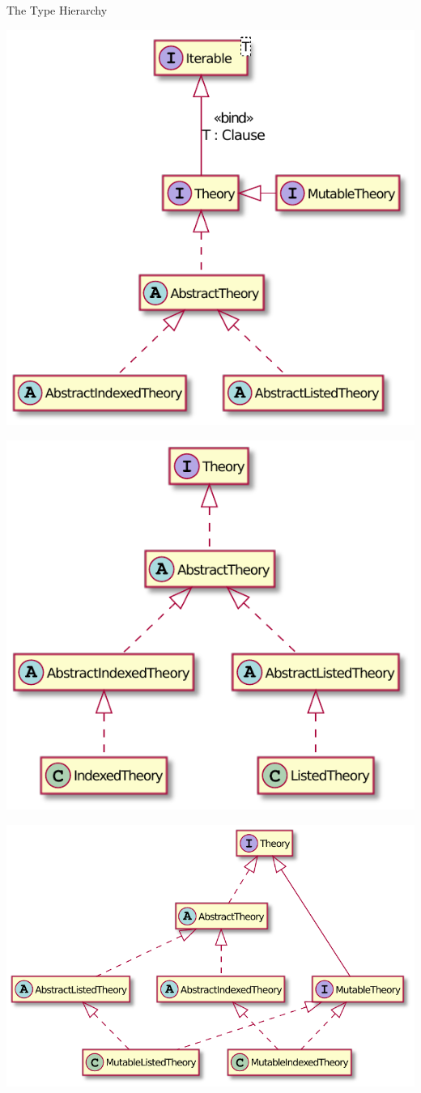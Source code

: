 \documentclass[handout]{beamer}
\begin{document}
\begin{frame}[allowframebreaks]{The  Type Hierarchy}

    \begin{center}
        \includegraphics[width=0.6\linewidth]{img/theory-base.pdf}
    \end{center}

    \framebreak

    \begin{center}
        \includegraphics[width=0.6\linewidth]{img/theory-immutable.pdf}
    \end{center}

    \framebreak

    \begin{center}
        \includegraphics[width=0.7\linewidth]{img/theory-mutable.pdf}
    \end{center}


\end{frame}
\end{document}
